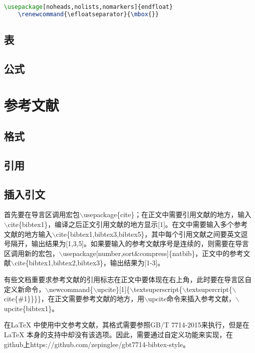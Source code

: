 \documentclass[cn,10pt,math=newtx,citestyle=gb7714-2015,bibstyle=gb7714-2015]{elegantbook}
\begin{document}
\begin{lstlisting}[language=tex]
	\usepackage[noheads,nolists,nomarkers]{endfloat}
	\renewcommand{\efloatseparator}{\mbox{}}
\end{lstlisting}

\section{表}

\section{公式}

\chapter{参考文献}

\section{格式}

\section{引用}

\section{插入引文}

首先要在导言区调用宏包$\backslash$usepackage\{cite\}；在正文中需要引用文献的地方，输入$\backslash$cite\{bibtex1\}，编译之后正文引用文献的地方显示[1]。在文中需要输入多个参考文献的地方输入$\backslash$cite\{bibtex1,bibtex3,bibtex5\}，其中每个引用文献之间要英文逗号隔开，输出结果为[1,3,5]。如果要输入的参考文献序号是连续的，则需要在导言区调用新的宏包，$\backslash$usepackage[number,sort\&compress]\{natbib\}，正文中的参考文献$\backslash$cite\{bibtex1,bibtex2,bibtex3\}，输出结果为[1-3]。

有些文档重要求参考文献的引用标志在正文中要体现在右上角，此时要在导言区自定义新命令，$\backslash$newcommand\{$\backslash$upcite\}[1]\{$\backslash$textsuperscript\{$\backslash$textsupercript\{$\backslash$cite\{\#1\}\}\}\}，在正文需要参考文献的地方，用$\backslash$upcite命令来插入参考文献，$\backslash$upcite\{bibtex1\}。


在LaTeX{} 中使用中文参考文献，其格式需要参照GB/T 7714-2015来执行，但是在LaTeX{} 本身的支持中却没有该选项。因此，需要通过自定义功能来实现，在github上https://github.com/zepinglee/gbt7714-bibtex-style。
\end{document}
